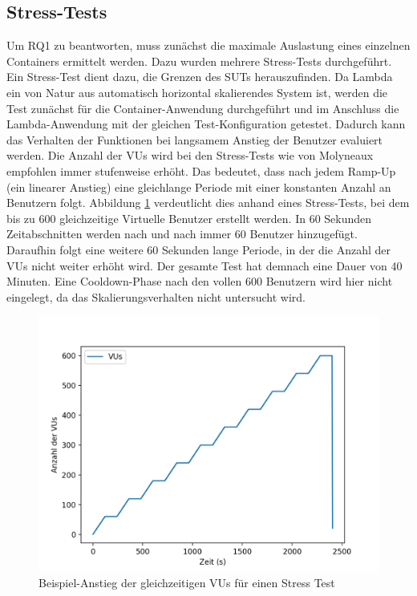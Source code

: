 \subsection{Stress-Tests}
Um RQ1 zu beantworten, muss zunächst die maximale Auslastung eines einzelnen Containers ermittelt werden. Dazu wurden mehrere Stress-Tests durchgeführt. Ein Stress-Test dient dazu, die Grenzen des SUTs herauszufinden. Da Lambda ein von Natur aus automatisch horizontal skalierendes System ist, werden die Test zunächst für die Container-Anwendung durchgeführt und im Anschluss die Lambda-Anwendung mit der gleichen Test-Konfiguration getestet. Dadurch kann das Verhalten der Funktionen bei langsamem Anstieg der Benutzer evaluiert werden. Die Anzahl der VUs wird bei den Stress-Tests wie von Molyneaux\cite{molyneaux_art_2014} empfohlen immer stufenweise erhöht. Das bedeutet, dass nach jedem Ramp-Up (ein linearer Anstieg) eine gleichlange Periode mit einer konstanten Anzahl an Benutzern folgt. Abbildung \ref{fig:stress-vus-example} verdeutlicht dies anhand eines Stress-Tests, bei dem bis zu 600 gleichzeitige Virtuelle Benutzer erstellt werden. In 60 Sekunden Zeitabschnitten werden nach und nach immer 60 Benutzer hinzugefügt. Daraufhin folgt eine weitere 60 Sekunden lange Periode, in der die Anzahl der VUs nicht weiter erhöht wird. Der gesamte Test hat demnach eine Dauer von 40 Minuten. Eine Cooldown-Phase nach den vollen 600 Benutzern wird hier nicht eingelegt, da das Skalierungsverhalten nicht untersucht wird.

\begin{figure}[H]
    \includegraphics[width=\textwidth]{img/stress-vus-example.png}
    \caption[Beispiel-Anstieg der gleichzeitigen VUs für einen Stress Test]{Beispiel-Anstieg der gleichzeitigen VUs für einen Stress Test}
    \label{fig:stress-vus-example}
\end{figure}

